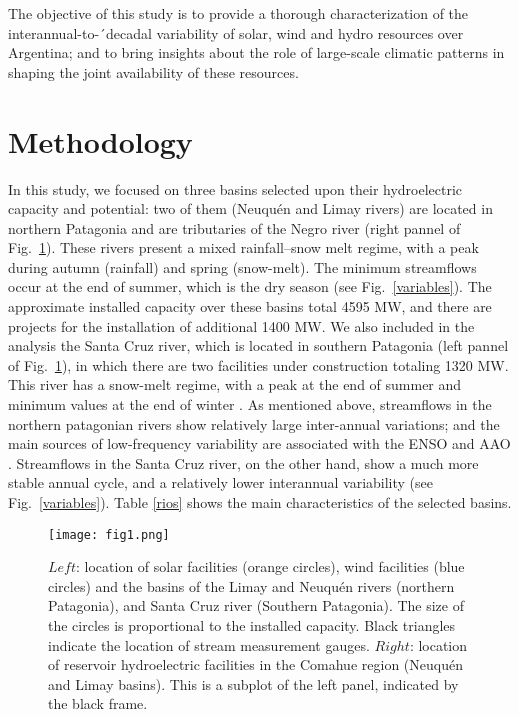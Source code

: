 \documentclass[AMA,Times1COL]{WileyNJDv5} %
\begin{document}
\begin{linenumbers}
The objective of this study is to provide a thorough characterization of the interannual-to-´decadal variability of solar, wind and hydro resources over Argentina; and to bring insights about the role of large-scale climatic patterns in shaping the joint availability of these resources.

\section{Methodology}

In this study, we focused on three basins selected upon their hydroelectric capacity and potential: two of them (Neuquén and Limay rivers) are located in northern Patagonia and are tributaries of the Negro river (right pannel of Fig.~\ref{location}). These rivers present a mixed rainfall–snow melt regime, with a peak during autumn (rainfall) and spring (snow-melt). The minimum streamflows occur at the end of summer, which is the dry season \cite{rivera2018regional} (see Fig.~\ref{variables}). The approximate installed capacity over these basins total 4595 MW, and there are projects for the installation of additional 1400 MW. We also included in the analysis the Santa Cruz river, which is located in southern Patagonia (left pannel of Fig.~\ref{location}), in which there are two facilities under construction totaling 1320 MW. This river has a snow-melt regime, with a peak at the end of summer and minimum values at the end of winter \cite{pasquini2011southern}. As mentioned above, streamflows in the northern patagonian rivers show relatively large inter-annual variations; and the main sources of low-frequency variability are associated with the ENSO and AAO \cite{araneo2008atmospheric,gonzalez2010statistical,berri2019nino, romero2020forecasting}. Streamflows in the Santa Cruz river, on the other hand, show a much more stable annual cycle, and a relatively lower interannual variability (see Fig.~\ref{variables}). Table \ref{rios} shows the main characteristics of the selected basins. 

\begin{figure}[hbpt]
	\centering
	\hspace*{-1cm}   
	\texttt{[image: fig1.png]}
	\caption{\label{location} $Left$: location of solar facilities (orange circles), wind facilities (blue circles) and the basins of the Limay and Neuquén rivers (northern Patagonia), and Santa Cruz river (Southern Patagonia). The size of the circles is proportional to the installed capacity. Black triangles indicate the location of stream measurement gauges. $Right$: location of reservoir hydroelectric facilities in the Comahue region (Neuquén and Limay basins). This is a subplot of the left panel, indicated by the black frame.}
\end{figure}


\end{linenumbers}
\end{document}
